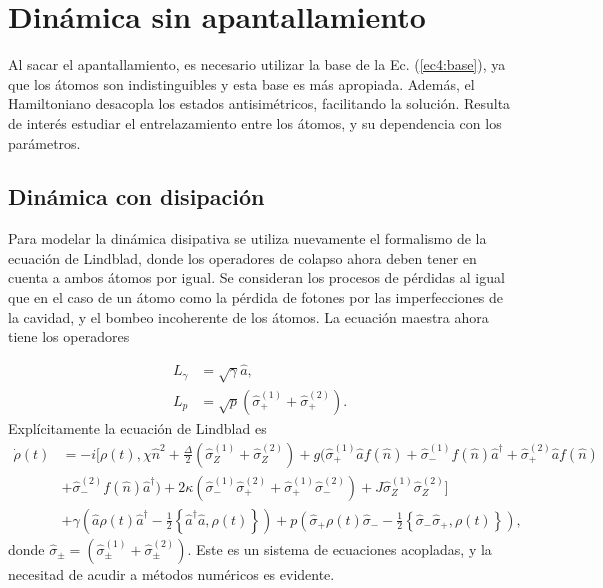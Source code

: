 \section{Dinámica sin apantallamiento}
\label{sec4:dinamica sin apantallamiento}

Al sacar el apantallamiento, es necesario utilizar la base de la Ec. (\ref{ec4:base}), ya que los átomos son indistinguibles y esta base es más apropiada. Además, el Hamiltoniano desacopla los estados antisimétricos, facilitando la solución. Resulta de interés estudiar el entrelazamiento entre los átomos, y su dependencia con los parámetros. 

\subsection{Dinámica con disipación}
Para modelar la dinámica disipativa se utiliza nuevamente el formalismo de la ecuación de Lindblad, donde los operadores de colapso ahora deben tener en cuenta a ambos átomos por igual. Se consideran los procesos de pérdidas al igual que en el caso de un átomo como la pérdida de fotones por las imperfecciones de la cavidad, y el bombeo incoherente de los átomos. La ecuación maestra ahora tiene los operadores

\begin{align}
    L_\gamma&=\sqrt{\gamma}\hat a, \\
    L_p &=\sqrt{p}(\hat\sigma_+^{(1)}+\hat\sigma_+^{(2)}).  
\end{align}
Explícitamente la ecuación de Lindblad es
\begin{equation}
\begin{aligned}
    \dot \rho(t) &= -i\bigg[\rho(t),\chi \hat n^2+\frac{ \Delta}{2}(\hat\sigma_Z^{(1)}+\hat\sigma_Z^{(2)})   
     +  g(\hat\sigma_+^{(1)}\hat a f(\hat n)+\hat\sigma_-^{(1)}f(\hat n) \hat a^\dagger + \hat\sigma_+^{(2)}\hat a f(\hat n) \\ &+\hat\sigma_-^{(2)}f(\hat n) \hat a^\dagger) + 2 \kappa (\hat \sigma_-^{(1)}\hat \sigma_+^{(2)}+\hat \sigma_+^{(1)}\hat \sigma_-^{(2)}) +  J \hat \sigma_Z^{(1)}\hat \sigma_Z^{(2)}\bigg] \\ &+ \gamma\left(\hat a\rho(t) \hat a^\dagger -\frac{1}{2}\left\{  \hat a^\dagger \hat a ,\rho(t) \right\} \right) + p\left(\hat\sigma_+\rho(t)\hat\sigma_--\frac{1}{2}\left\{\hat\sigma_-\hat\sigma_+,\rho(t)\right\}\right),
\end{aligned}
\end{equation}
donde $\hat\sigma_\pm=(\hat\sigma_\pm^{(1)}+\hat\sigma_\pm^{(2)})$.
Este es un sistema de ecuaciones acopladas, y la necesitad de acudir a métodos numéricos es evidente.

